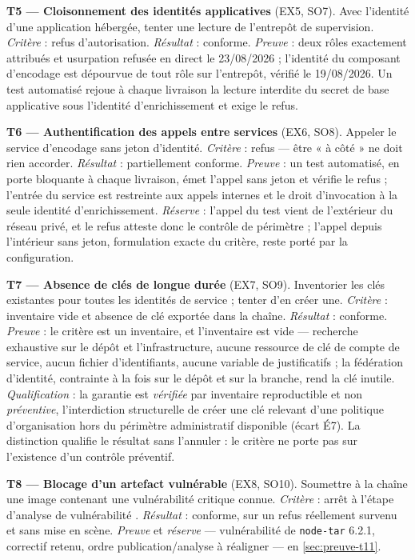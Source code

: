 \textbf{T5 --- Cloisonnement des identités applicatives} (EX5, SO7). Avec l'identité d'une
application hébergée, tenter une lecture de l'entrepôt de supervision. \emph{Critère} : refus
d'autorisation. \emph{Résultat} : conforme. \emph{Preuve} : deux rôles exactement attribués et usurpation refusée
en direct le 23/08/2026 ; l'identité du composant d'encodage est dépourvue de tout rôle sur
l'entrepôt, vérifié le 19/08/2026. Un test automatisé rejoue à chaque livraison la lecture
interdite du secret de base applicative sous l'identité d'enrichissement et exige le refus.

\textbf{T6 --- Authentification des appels entre services} (EX6, SO8). Appeler le service
d'encodage sans jeton d'identité. \emph{Critère} : refus --- être « à côté » ne doit rien
accorder. \emph{Résultat} : partiellement conforme. \emph{Preuve} : un test automatisé, en porte bloquante à
chaque livraison, émet l'appel sans jeton et vérifie le refus ; l'entrée du service est restreinte
aux appels internes et le droit d'invocation à la seule identité d'enrichissement.
\emph{Réserve} : l'appel du test vient de l'extérieur du réseau privé, et le refus atteste donc le
contrôle de périmètre ; l'appel depuis l'intérieur sans jeton, formulation exacte du critère, reste
porté par la configuration.

\textbf{T7 --- Absence de clés de longue durée} (EX7, SO9). Inventorier les clés existantes pour
toutes les identités de service ; tenter d'en créer une. \emph{Critère} : inventaire vide et
absence de clé exportée dans la chaîne. \emph{Résultat} : conforme. \emph{Preuve} : le critère est
un inventaire, et l'inventaire est vide --- recherche exhaustive sur le dépôt et l'infrastructure,
aucune ressource de clé de compte de service, aucun fichier d'identifiants, aucune variable de
justificatifs ; la fédération d'identité, contrainte à la fois sur le dépôt et sur la branche, rend
la clé inutile. \emph{Qualification} : la garantie est \emph{vérifiée} par inventaire reproductible
et non \emph{préventive}, l'interdiction structurelle de créer une clé relevant d'une politique
d'organisation hors du périmètre administratif disponible (écart É7). La distinction qualifie le
résultat sans l'annuler : le critère ne porte pas sur l'existence d'un contrôle préventif.

\textbf{T8 --- Blocage d'un artefact vulnérable} (EX8, SO10). Soumettre à la chaîne une image
contenant une vulnérabilité critique connue. \emph{Critère} : arrêt à l'étape d'analyse de
vulnérabilité \cite{slsa_framework}. \emph{Résultat} : conforme, sur un refus réellement survenu et
sans mise en scène. \emph{Preuve} et \emph{réserve} --- vulnérabilité de \texttt{node-tar} 6.2.1,
correctif retenu, ordre publication/analyse à réaligner --- en \cref{sec:preuve-t11}.

